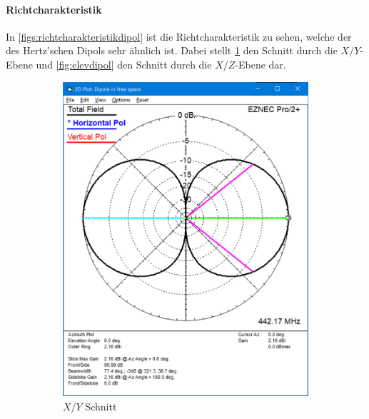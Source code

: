 \documentclass[colorlinks = true, allcolors = black, ngerman, 11pt,
a4paper, twoside, titlepage]{article}
\numberwithin{figure}{section}
\begin{document}
	\paragraph{Richtcharakteristik}
	In \cref{figs:richtcharakteristikdipol} ist die Richtcharakteristik zu sehen, welche der des Hertz'schen Dipols sehr ähnlich ist. Dabei stellt \cref{fig:azimutdipol} den Schnitt durch die $X/Y$-Ebene und \cref{fig:elevdipol} den Schnitt durch die $X/Z$-Ebene dar.
	\begin{figure}[h]
		\centering
		\begin{subfigure}{0.5\textwidth}
			\centering
			\includegraphics[height=1.2\textwidth]{imgs/azim_richtchar_dipol.png}
			\caption{$X/Y$ Schnitt}
			\label{fig:azimutdipol}
		\end{subfigure}%
		\hfil
		\begin{subfigure}{0.5\textwidth}
			\centering

\end{subfigure}
\end{figure}
\end{document}
